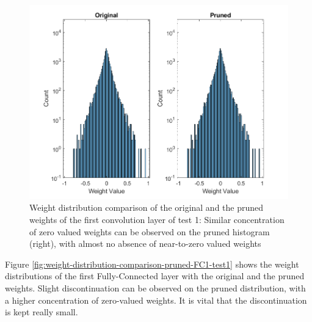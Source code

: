 \begin{figure} [H]
	\centering
	\includegraphics[width=\textwidth]{Images/Weights-distributions/pruned/37.97/weight-distribution-conv1.png}
	\decoRule
	\caption[Weight distribution comparison of the original and the pruned weights of the first convolution layer of test 1]{Weight distribution comparison of the original and the pruned weights of the first convolution layer of test 1: Similar concentration of zero valued weights can be observed on the pruned histogram (right), with almost no absence of near-to-zero valued weights}
	\label{fig:weight-distribution-comparison-pruned-conv1-test1}
\end{figure}

Figure \ref{fig:weight-distribution-comparison-pruned-FC1-test1} shows the weight distributions of the first Fully-Connected layer with the original and the pruned weights. Slight discontinuation can be observed on the pruned distribution, with a higher concentration of zero-valued weights. It is vital that the discontinuation is kept really small.

